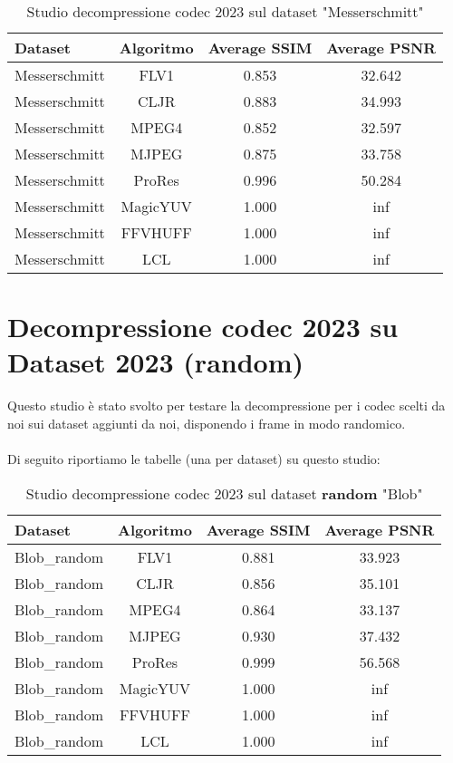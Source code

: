 \begin{table}[ht!]
\centering
\begin{tabular}{|l|c|c|c|}
\hline
Dataset               & Algoritmo & Average SSIM & Average PSNR
\\ \hline
Messerschmitt         & FLV1      & 0.853        & 32.642       \\ \hline
Messerschmitt         & CLJR      & 0.883        & 34.993       \\ \hline
Messerschmitt         & MPEG4     & 0.852        & 32.597       \\ \hline
Messerschmitt         & MJPEG     & 0.875        & 33.758       \\ \hline
Messerschmitt         & ProRes    & 0.996        & 50.284       \\ \hline
Messerschmitt         & MagicYUV  & 1.000        & inf          \\ \hline
Messerschmitt         & FFVHUFF   & 1.000        & inf          \\ \hline
Messerschmitt         & LCL       & 1.000        & inf          \\ \hline
\end{tabular}
\caption{Studio decompressione codec 2023 sul dataset  "Messerschmitt"}
\end{table}

\clearpage
\section{Decompressione codec 2023 su Dataset 2023 (random)}
Questo studio è stato svolto per testare la decompressione per i codec scelti da noi sui dataset aggiunti da noi, disponendo i frame in modo randomico.
\\
\\
Di seguito riportiamo le tabelle (una per dataset) su questo studio:

\begin{table}[!ht]
\centering
\begin{tabular}{|l|c|c|c|}
\hline
Dataset               & Algoritmo & Average SSIM & Average PSNR
\\ \hline
Blob\_random          & FLV1      & 0.881        & 33.923       \\ \hline
Blob\_random          & CLJR      & 0.856        & 35.101       \\ \hline
Blob\_random          & MPEG4     & 0.864        & 33.137       \\ \hline
Blob\_random          & MJPEG     & 0.930        & 37.432       \\ \hline
Blob\_random          & ProRes    & 0.999        & 56.568       \\ \hline
Blob\_random          & MagicYUV  & 1.000        & inf          \\ \hline
Blob\_random          & FFVHUFF   & 1.000        & inf          \\ \hline
Blob\_random          & LCL       & 1.000        & inf          \\ \hline
\end{tabular}
\caption{Studio decompressione codec 2023 sul dataset \textbf{random} "Blob"}
\end{table}

